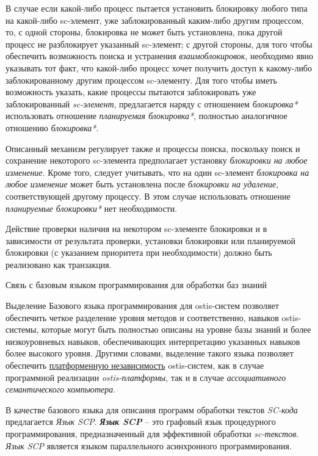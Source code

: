 \begin{frame}{}
	\topline
	\justifying
	\vspace{10mm}
	
В случае если какой-либо процесс пытается установить блокировку любого типа на какой-либо sc-элемент, уже заблокированный каким-либо другим процессом, то, с одной стороны, блокировка не может быть установлена, пока другой процесс не разблокирует указанный sc-элемент; с другой стороны, для того чтобы обеспечить возможность поиска и устранения \textit{взаимоблокировок}, необходимо явно указывать тот факт, что какой-либо процесс хочет получить доступ к какому-либо заблокированному другим процессом sc-элементу. Для того чтобы иметь возможность указать, какие процессы пытаются заблокировать уже заблокированный \textit{sc-элемент}, предлагается наряду с отношением \textit{блокировка*} использовать отношение \textit{планируемая блокировка*}, полностью аналогичное отношению \textit{блокировка*}.
\end{frame}

\begin{frame}{}
	\topline
	\justifying
	\vspace{10mm}
	
Описанный механизм регулирует также и процессы поиска, поскольку поиск и сохранение некоторого sc-элемента предполагает установку \textit{блокировки на любое изменение}. Кроме того, следует учитывать, что на один sc-элемент \textit{блокировка на любое изменение} может быть установлена после \textit{блокировки на удаление}, соответствующей другому процессу. В этом случае использовать отношение \textit{планируемые блокировки*} нет необходимости.
	
Действие проверки наличия на некотором sc-элементе блокировки и в зависимости от результата проверки, установки блокировки или планируемой блокировки (с указанием приоритета при необходимости) должно быть реализовано как транзакция.
\end{frame}

\begin{frame}{Связь с базовым языком программирования для обработки баз знаний}
\topline
\justifying
\vspace{10mm}


    Выделение Базового языка программирования для ostis-систем позволяет обеспечить четкое разделение уровня методов и соответственно, навыков ostis-системы, которые могут быть полностью описаны на уровне базы знаний и более низкоуровневых навыков, обеспечивающих интерпретацию указанных навыков более высокого уровня. Другими словами, выделение такого языка позволяет обеспечить \uline{платформенную независимость} ostis-систем, как в случае программной реализации \textit{ostis-платформы}, так и в случае \textit{ассоциативного семантического компьютера}.
    \par В качестве базового языка для описания программ обработки текстов \textit{SC-кода} предлагается \textit{Язык SCP}. \textbf{\textit{Язык SCP}} -- это графовый язык процедурного программирования, предназначенный для эффективной обработки \textit{sc-текстов}. \textit{Язык SCP} является языком параллельного асинхронного программирования.
\end{frame}

